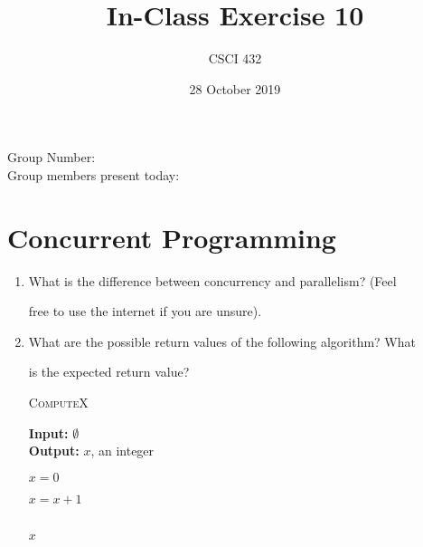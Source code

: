 \documentclass{article}
\title{In-Class Exercise 10}
\author{CSCI 432}
\date{28 October 2019}
\begin{document}
\maketitle



\noindent

Group Number:\\

Group members present today:



\section*{Concurrent Programming}



\begin{enumerate}

    \item What is the difference between concurrency and parallelism? (Feel

        free to use the internet if you are unsure).

        \vspace{1in}





    \item What are the possible return values of the following algorithm?  What

        is the expected return value?

        \begin{algorithm}\caption{\textsc{ComputeX}}

                {\bf Input:} $\emptyset$\\

                {\bf Output:} $x$, an integer

            \begin{algorithmic}[1]

                \State $x=0$


                \State $x=x+1$

                \EndFor\\

                \Return $x$

            \end{algorithmic}

        \end{algorithm}


\end{enumerate}
\end{document}

